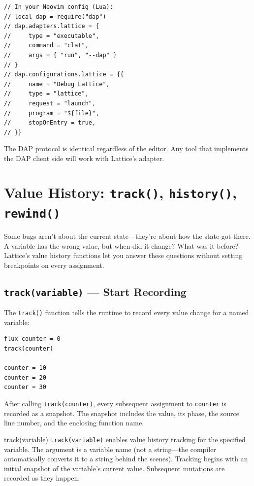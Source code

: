\begin{lstlisting}[language=Lattice, caption={Neovim nvim-dap configuration}]
// In your Neovim config (Lua):
// local dap = require("dap")
// dap.adapters.lattice = {
//     type = "executable",
//     command = "clat",
//     args = { "run", "--dap" }
// }
// dap.configurations.lattice = {{
//     name = "Debug Lattice",
//     type = "lattice",
//     request = "launch",
//     program = "${file}",
//     stopOnEntry = true,
// }}
\end{lstlisting}

The DAP protocol is identical regardless of the editor.
Any tool that implements the DAP client side will work with Lattice's adapter.

\section{Value History: \texttt{track()}, \texttt{history()}, \texttt{rewind()}}\label{sec:value-history}

Some bugs aren't about the current state---they're about how the state got there.
A variable has the wrong value, but when did it change?
What was it before?
Lattice's value history functions let you answer these questions without setting breakpoints on every assignment.

\subsection{\texttt{track(variable)} --- Start Recording}\label{sec:track}

The \lstinline|track()| function tells the runtime to record every value change for a named variable:

\begin{lstlisting}[language=Lattice, caption={Tracking a variable}]
flux counter = 0
track(counter)

counter = 10
counter = 20
counter = 30
\end{lstlisting}

After calling \lstinline|track(counter)|, every subsequent assignment to \lstinline|counter| is recorded as a snapshot.
The snapshot includes the value, its phase, the source line number, and the enclosing function name.

\begin{defnbox}{track(variable)}
\lstinline|track(variable)| enables value history tracking for the specified variable.
The argument is a variable name (not a string---the compiler automatically converts it to a string behind the scenes).
Tracking begins with an initial snapshot of the variable's current value.
Subsequent mutations are recorded as they happen.
\end{defnbox}

